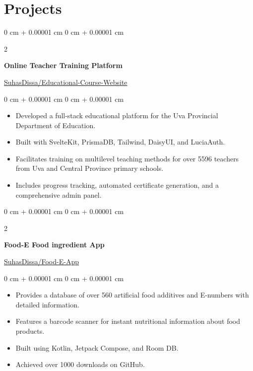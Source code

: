 \documentclass[10pt, letterpaper]{article}
\newenvironment{highlights}{
	\begin{itemize}[
		topsep=0.10 cm,
		parsep=0.10 cm,
		partopsep=0pt,
		itemsep=0pt,
		leftmargin=0 cm + 10pt
		]
	}{
	\end{itemize}
} %
\newenvironment{onecolentry}{
	\begin{adjustwidth}{
			0 cm + 0.00001 cm
		}{
			0 cm + 0.00001 cm
		}
	}{
	\end{adjustwidth}
} %
\newenvironment{twocolentry}[2][]{
	\onecolentry
	\def\secondColumn{#2}
	\setcolumnwidth{\fill, 4.5 cm}
	\begin{paracol}{2}
	}{
		\switchcolumn \raggedleft \secondColumn
	\end{paracol}
	\endonecolentry
} %
\begin{document}
	\section{Projects}
	\begin{twocolentry}{\href{https://github.com/SuhasDissa/Educational-Course-Website}{SuhasDissa/Educational-Course-Website}}
		\textbf{Online Teacher Training Platform}
	\end{twocolentry}
	\vspace{0.10 cm}
	\begin{onecolentry}
		\begin{highlights}
			\item Developed a full-stack educational platform for the Uva Provincial Department of Education.
			\item Built with SvelteKit, PrismaDB, Tailwind, DaisyUI, and LuciaAuth.
			\item Facilitates training on multilevel teaching methods for over 5596 teachers from Uva and Central Province primary schools.
			\item Includes progress tracking, automated certificate generation, and a comprehensive admin panel.
		\end{highlights}
	\end{onecolentry}
	
	
	\vspace{0.5 cm}
	
	\begin{twocolentry}{\href{https://github.com/SuhasDissa/Food-E-App}{SuhasDissa/Food-E-App}}
		\textbf{Food-E Food ingredient App}
	\end{twocolentry}
	\vspace{0.10 cm}
	\begin{onecolentry}
		\begin{highlights}
			\item Provides a database of over 560 artificial food additives and E-numbers with detailed information.
			\item Features a barcode scanner for instant nutritional information about food products.
			\item Built using Kotlin, Jetpack Compose, and Room DB.
			\item Achieved over 1000 downloads on GitHub.
		\end{highlights}
	\end{onecolentry}
	
	\vspace{0.5 cm}
	
\end{document}
